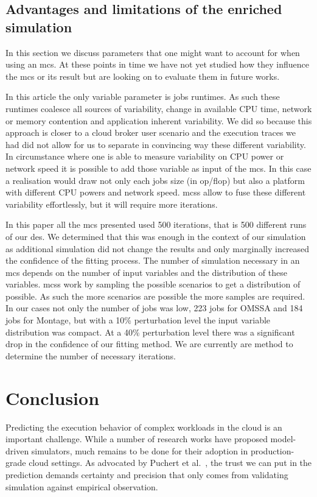 \documentclass[10pt,conference,compsocconf]{IEEEtran}
\begin{document}
\subsection{Advantages and limitations of the enriched simulation}\label{sec:lim}

In this section we discuss parameters that one might want to account for when
using an \ac{mcs}. At these points in time we have not yet studied how they
influence the \ac{mcs} or its result but are looking on to evaluate them in
future works.

In this article the only variable parameter is jobs runtimes. As such these
runtimes coalesce all sources of variability, change in available CPU time,
network or memory contention and application inherent variability. We did so
because this approach is closer to a cloud broker user scenario and  the
execution traces we had did not allow for us to separate in convincing way these
different variability. In circumstance where one is able to measure variability
on CPU power or network speed it is possible to add those variable as input of
the \ac{mcs}. In this case a realisation would draw not only each jobs size (in
op/flop) but also a platform with different CPU powers and network speed.
\acp{mcs} allow to fuse these different variability effortlessly, but it will
require more iterations. 

In this paper all the \ac{mcs} presented used 500 iterations, that is 500
different runs of our \ac{des}. We determined that this was enough in the
context of our simulation as additional simulation did not change the results
and only marginally increased the confidence of the fitting process. The number
of simulation necessary in an \ac{mcs} depends on the number of input variables
and the distribution of these variables. \aclp{mcs} work by sampling the possible
scenarios to get a distribution of possible. As such the more scenarios are
possible the more samples are required. In our cases not only the number of jobs
was low, 223 jobs for OMSSA and 184 jobs for Montage, but with a 10\%
perturbation level the input variable distribution was compact. At a 40\%
perturbation level there was a significant drop in the confidence of our fitting
method. We are currently are method to determine the number of necessary
iterations.

\section{Conclusion}
Predicting  the execution  behavior  of complex  workloads in  the  cloud is  an
important challenge. While a number of research works have proposed model-driven
simulators, much remains to be done for their adoption in production-grade cloud
settings. As  advocated by Puchert  et al.~\cite{PucherGWK15}, the trust  we can
put in  the prediction  demands certainty  and precision  that only  comes from
validating simulation against empirical observation.
\end{document}
